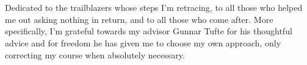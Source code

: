 \vspace*{7cm}
\section*{\Acknowledgements}
\begin{center}

  Dedicated to the trailblazers whose steps I'm retracing, to all those who
helped me out asking nothing in return, and to all those who come after. More
specifically, I'm grateful towards my advisor Gunnar Tufte for his thoughtful
advice and for freedom he has given me to choose my own approach, only
correcting my course when absolutely necessary.
  
\end{center}

\cleardoublepage

